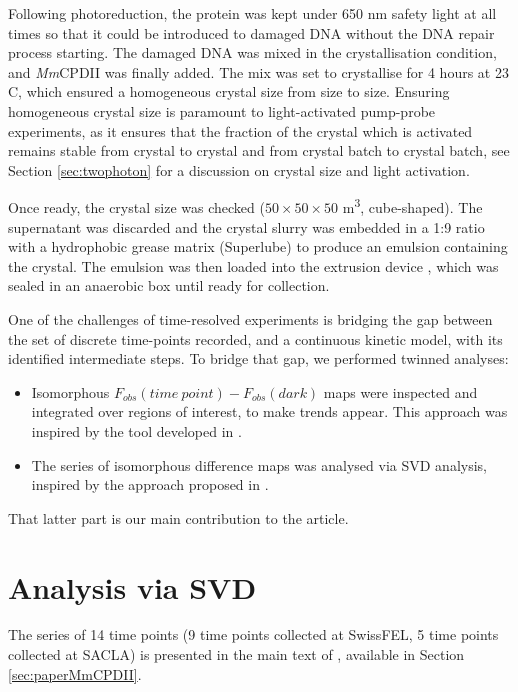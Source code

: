 Following photoreduction, the protein was kept under 650 nm safety light at all times so that it could be introduced to damaged DNA without the DNA repair process starting. The damaged DNA was mixed in the crystallisation condition, and \textit{Mm}CPDII was finally added. The mix was set to crystallise for 4 hours at 23 \degree C, which ensured a homogeneous crystal size from size to size. Ensuring homogeneous crystal size is paramount to light-activated pump-probe experiments, as it ensures that the fraction of the crystal which is activated remains stable from crystal to crystal and from crystal batch to crystal batch, see Section \ref{sec:twophoton} for a discussion on crystal size and light activation. 

Once ready, the crystal size was checked (\(50 \times 50 \times 50\) \textmu m\textsuperscript{3}, cube-shaped). The supernatant was discarded and the crystal slurry was embedded in a 1:9 ratio with a hydrophobic grease matrix (Superlube) to produce an emulsion containing the crystal. The emulsion was then loaded into the extrusion device \parencite{weierstallLipidicCubicPhase2014}, which was sealed in an anaerobic box until ready for collection. 

One of the challenges of time-resolved experiments is bridging the gap between the set of discrete time-points recorded, and a continuous kinetic model, with its identified intermediate steps. To bridge that gap, we performed twinned analyses: 
\begin{itemize}
  \item Isomorphous \(F_{obs}(time\ point) - F_{obs}(dark)\) maps were inspected and integrated over regions of interest, to make trends appear. This approach was inspired by the tool developed in \cite{wickstrandToolVisualizingProtein2020}.
  \item The series of isomorphous difference maps was analysed via SVD analysis, inspired by the approach proposed in \cite{schmidtApplicationSingularValue2003}.
\end{itemize}

That latter part is our main contribution to the article. 

\section{Analysis via SVD}
The series of 14 time points (9 time points collected at SwissFEL, 5 time points collected at SACLA) is presented in the main text of \cite{maestre-reynaVisualizingDNARepair2023a}, available in Section \ref{sec:paperMmCPDII}. 

